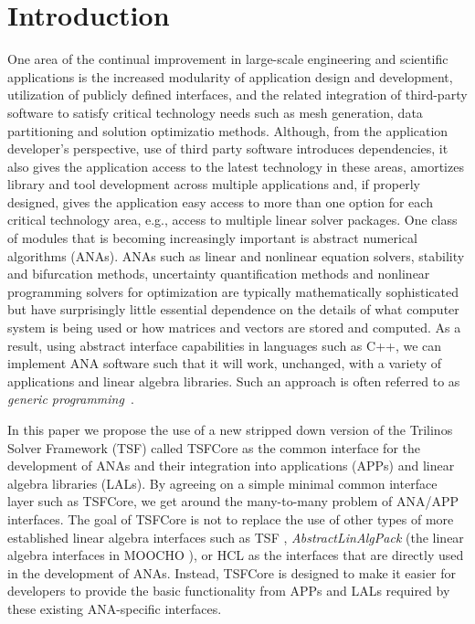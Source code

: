 \documentclass[10pt,fleqn]{article}
\begin{document}
\section{Introduction}

One area of the continual improvement in large-scale engineering 
and scientific applications is the increased modularity of application
design and development,  utilization of publicly defined interfaces,
and the related integration of third-party software
to satisfy critical technology needs such as mesh generation, data 
partitioning and solution optimizatio methods.  Although, 
from the application 
developer's perspective, use of third party software introduces 
dependencies, it also gives the application access to the latest
technology in these areas, amortizes library and tool development
across multiple applications and, if properly designed, gives the
application easy access to more than one option for each critical
technology area, e.g., access to multiple linear solver packages.
One class of modules that is becoming
increasingly important is abstract numerical algorithms (ANAs).  ANAs
such as linear and nonlinear equation solvers,
stability and bifurcation methods,
uncertainty quantification methods and nonlinear programming solvers
for optimization are typically mathematically 
sophisticated but have surprisingly little essential dependence on the
details of what computer system is being used or how matrices and
vectors are stored and computed.  As a result, using abstract
interface capabilities in languages such as C++, we can implement ANA
software such that it will work, unchanged, with a variety of
applications and linear algebra libraries.  Such an approach is often
referred to as {\it generic programming}~\cite{ref:boost_generic_programming}.

In this paper we propose the use of a new stripped
down version of the Trilinos Solver Framework (TSF) called TSFCore as
the common interface for the development of ANAs and their 
integration into applications (APPs) and
linear algebra libraries (LALs).  By agreeing on a simple minimal
common interface layer such as TSFCore, we get around the many-to-many
problem of ANA/APP interfaces.  The goal of TSFCore is not to
replace the use of other types of more established linear algebra
interfaces such as TSF \cite{ref:TSF}, \textit{AbstractLinAlgPack}
(the linear algebra interfaces in MOOCHO \cite{ref:moochouserguide}),
or HCL \cite{ref:hcl} as the interfaces that are directly used in the
development of ANAs.  Instead, TSFCore is designed to make it easier
for developers to provide the basic functionality from APPs and LALs
required by these existing ANA-specific interfaces.  
\end{document}
